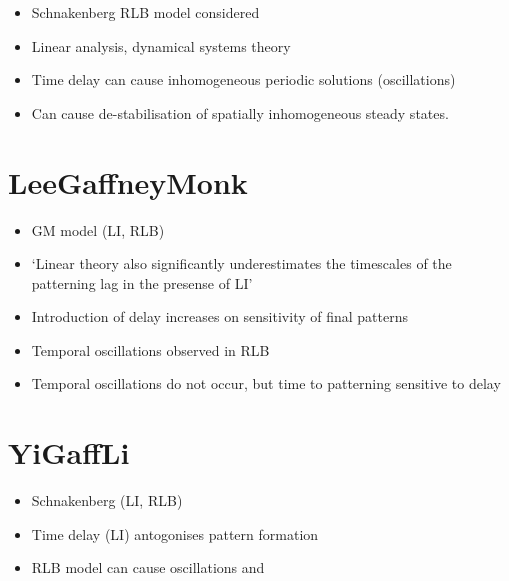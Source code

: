 \documentclass[12pt]{article}
\begin{document}
\begin{itemize}
\item Schnakenberg RLB model considered
\item Linear analysis, dynamical systems theory
\item Time delay can cause inhomogeneous periodic solutions (oscillations)
\item Can cause de-stabilisation of spatially inhomogeneous steady states.
\end{itemize}

\section{LeeGaffneyMonk}
\begin{itemize}
  \item GM model (LI, RLB)
  \item `Linear theory also significantly underestimates the timescales of the patterning lag in the presense of LI'
  \item Introduction of delay increases on sensitivity of final patterns
  \item Temporal oscillations observed in RLB
  \item Temporal oscillations do not occur, but time to patterning sensitive to delay
\end{itemize}

\section{YiGaffLi}

\begin{itemize}
\item Schnakenberg (LI, RLB)
\item Time delay (LI) antogonises pattern formation
\item RLB model can cause oscillations and

\end{itemize}
\end{document}
